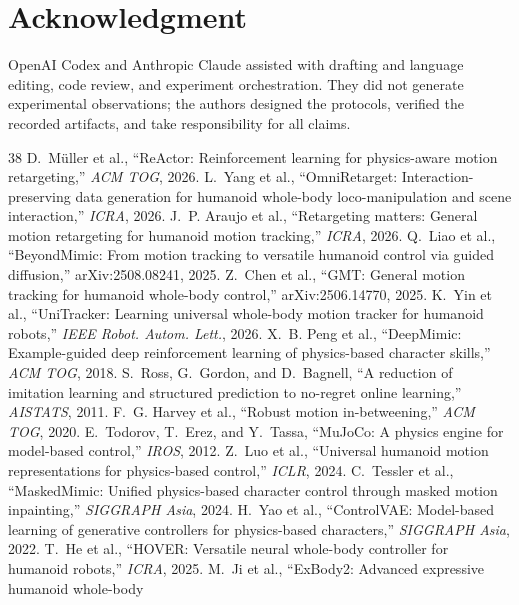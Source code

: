 \documentclass[conference]{IEEEtran}
\begin{document}
\section*{Acknowledgment}
OpenAI Codex and Anthropic Claude assisted with drafting and language editing, code
review, and experiment orchestration.  They did not generate experimental observations;
the authors designed the protocols, verified the recorded artifacts, and take
responsibility for all claims.

\begin{thebibliography}{38}
 D.~M{\"u}ller et al., ``ReActor: Reinforcement learning for
physics-aware motion retargeting,'' \emph{ACM TOG}, 2026.
 L.~Yang et al., ``OmniRetarget: Interaction-preserving data
generation for humanoid whole-body loco-manipulation and scene interaction,'' \emph{ICRA}, 2026.
 J.~P. Araujo et al., ``Retargeting matters: General motion retargeting for
humanoid motion tracking,'' \emph{ICRA}, 2026.
 Q.~Liao et al., ``BeyondMimic: From motion tracking to versatile
humanoid control via guided diffusion,'' arXiv:2508.08241, 2025.
 Z.~Chen et al., ``GMT: General motion tracking for humanoid whole-body
control,'' arXiv:2506.14770, 2025.
 K.~Yin et al., ``UniTracker: Learning universal whole-body motion
tracker for humanoid robots,'' \emph{IEEE Robot. Autom. Lett.}, 2026.
 X.~B. Peng et al., ``DeepMimic: Example-guided deep reinforcement
learning of physics-based character skills,'' \emph{ACM TOG}, 2018.
 S.~Ross, G.~Gordon, and D.~Bagnell, ``A reduction of imitation learning
and structured prediction to no-regret online learning,'' \emph{AISTATS}, 2011.
 F.~G. Harvey et al., ``Robust motion in-betweening,'' \emph{ACM TOG},
2020.
 E.~Todorov, T.~Erez, and Y.~Tassa, ``MuJoCo: A physics engine for
model-based control,'' \emph{IROS}, 2012.
 Z.~Luo et al., ``Universal humanoid motion representations for
physics-based control,'' \emph{ICLR}, 2024.
 C.~Tessler et al., ``MaskedMimic: Unified physics-based character
control through masked motion inpainting,'' \emph{SIGGRAPH Asia}, 2024.
 H.~Yao et al., ``ControlVAE: Model-based learning of generative
controllers for physics-based characters,'' \emph{SIGGRAPH Asia}, 2022.
 T.~He et al., ``HOVER: Versatile neural whole-body controller for
humanoid robots,'' \emph{ICRA}, 2025.
 M.~Ji et al., ``ExBody2: Advanced expressive humanoid whole-body

\end{thebibliography}
\end{document}

